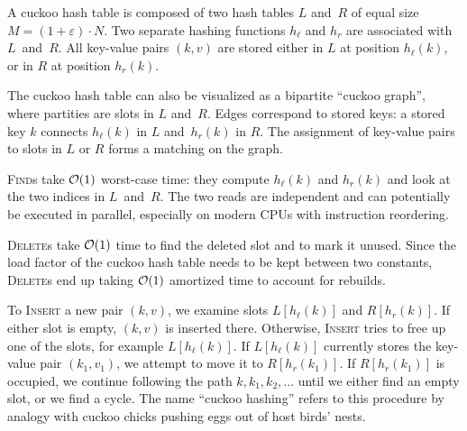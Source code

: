 A cuckoo hash table is composed of two hash tables $L$ and~$R$ of equal size
$M=(1+\varepsilon)\cdot N$.
Two separate hashing functions $h_\ell$ and $h_r$ are associated with
$L$~and~$R$.
All key-value pairs $(k,v)$ are stored either in $L$ at position $h_\ell(k)$,
or in $R$ at position $h_r(k)$.

The cuckoo hash table can also be visualized as a bipartite ``cuckoo graph'',
where partities are slots in $L$ and~$R$. Edges correspond to stored keys:
a stored key $k$ connects $h_\ell(k)$ in $L$ and~$h_r(k)$ in $R$. The assignment
of key-value pairs to slots in $L$ or $R$ forms a matching on the graph.

\textsc{Find}s take $\mathcal{O}(1)$ worst-case time: they compute $h_\ell(k)$ and $h_r(k)$
and look at the two indices in $L$~and~$R$. The two reads are independent and
can potentially be executed in parallel, especially on modern CPUs with
instruction reordering.

\textsc{Delete}s take $\mathcal{O}(1)$ time to find the deleted slot and to mark
it unused. Since the load factor of the cuckoo hash table needs to be kept
between two constants, \textsc{Delete}s end up taking $\mathcal{O}(1)$ amortized time
to account for rebuilds.

To \textsc{Insert} a new pair $(k,v)$, we examine slots $L[h_\ell(k)]$ and
$R[h_r(k)]$. If either slot is empty, $(k,v)$ is inserted there. Otherwise,
\textsc{Insert} tries to free up one of the slots, for example $L[h_\ell(k)]$.
If $L[h_\ell(k)]$ currently stores the key-value pair $(k_1,v_1)$, we attempt to
move it to $R[h_r(k_1)]$. If $R[h_r(k_1)]$ is occupied, we continue following
the path $k,k_1,k_2,\ldots$ until we either find an empty slot, or we find
a cycle.
The name ``cuckoo hashing'' refers to this procedure by analogy with
cuckoo chicks pushing eggs out of host birds' nests.


